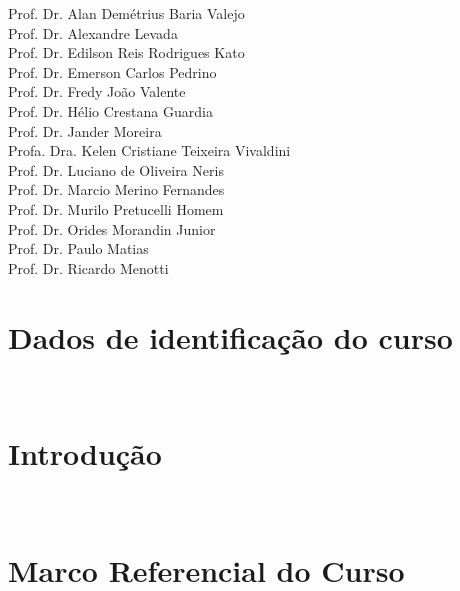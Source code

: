 \documentclass[11pt,a4paper]{report}
\begin{document}
\begin{center}
    Prof. Dr. Alan Demétrius Baria Valejo\\
    Prof. Dr. Alexandre Levada\\
    Prof. Dr. Edilson Reis Rodrigues Kato\\
    Prof. Dr. Emerson Carlos Pedrino\\
    Prof. Dr. Fredy João Valente\\
    Prof. Dr. Hélio Crestana Guardia\\
    Prof. Dr. Jander Moreira\\
    Profa. Dra. Kelen Cristiane Teixeira Vivaldini\\
    Prof. Dr. Luciano de Oliveira Neris\\
    Prof. Dr. Marcio Merino Fernandes\\
    Prof. Dr. Murilo Pretucelli Homem \\
    Prof. Dr. Orides Morandin Junior\\
    Prof. Dr. Paulo Matias\\
    Prof. Dr. Ricardo Menotti\\

    \vspace{1.5ex}

\end{center}


\clearpage


\chapter*{Dados de identificação do curso}~\label{cha:dados}


\singlespacing
\tableofcontents
\listoffigures
\listoftables

\doublespacing


\chapter{Introdução}~\label{cha:intro}


\chapter{Marco Referencial do Curso}~\label{cha:MarcoReferencial}

\end{document}
